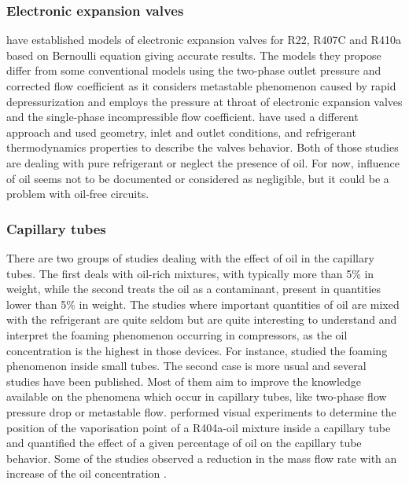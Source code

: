 \subsubsection{Electronic expansion valves}

\citet{Liang-Zhijiu-2009a} have established models of electronic
expansion valves for R22, R407C and R410a based on Bernoulli equation
giving accurate results. The models they propose differ from some
conventional models using the two-phase outlet pressure and corrected
flow coefficient as it considers metastable phenomenon caused by rapid
depressurization and employs the pressure at throat of electronic
expansion valves and the single-phase incompressible flow
coefficient. \citet{Park-Kim-2007a} have used a different approach and
used geometry, inlet and outlet conditions, and refrigerant
thermodynamics properties to describe the valves behavior. Both of
those studies are dealing with pure refrigerant or neglect the
presence of oil. For now, influence of oil seems not to be documented
or considered as negligible, but it could be a problem with oil-free
circuits.

\subsubsection{Capillary tubes}

There are two groups of studies dealing with the effect of oil in the
capillary tubes. The first deals with oil-rich mixtures, with
typically more than 5\% in weight, while the second treats the oil as
a contaminant, present in quantities lower than 5\% in weight. The
studies where important quantities of oil are mixed with the
refrigerant are quite seldom but are quite interesting to understand
and interpret the foaming phenomenon occurring in compressors, as the
oil concentration is the highest in those devices. For instance,
\citet{Poiate-Gasche-2006a} studied the foaming phenomenon inside
small tubes. The second case is more usual and several studies have
been published. Most of them aim to improve the knowledge available on
the phenomena which occur in capillary tubes, like two-phase flow
pressure drop or metastable flow. \citet{Motta-Braga-2002a} performed visual
experiments to determine the position of the vaporisation point of a
R404a-oil mixture inside a capillary tube and quantified the effect of
a given percentage of oil on the capillary tube behavior. Some of the
studies observed a reduction in the mass flow rate with an increase of
the oil concentration \citep{Motta-Parise-2001a,Fukuta-Ogi-2003a}.

